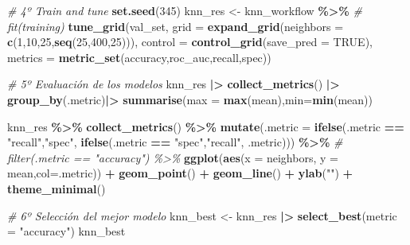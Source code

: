 \documentclass[12pt,a4paper,]{book}
\newenvironment{Shaded}{\begin{snugshade}}{\end{snugshade}}
\newcommand{\AttributeTok}[1]{\textcolor[rgb]{0.13,0.29,0.53}{#1}}
\newcommand{\CommentTok}[1]{\textcolor[rgb]{0.56,0.35,0.01}{\textit{#1}}}
\newcommand{\ConstantTok}[1]{\textcolor[rgb]{0.56,0.35,0.01}{#1}}
\newcommand{\DecValTok}[1]{\textcolor[rgb]{0.00,0.00,0.81}{#1}}
\newcommand{\FunctionTok}[1]{\textcolor[rgb]{0.13,0.29,0.53}{\textbf{#1}}}
\newcommand{\NormalTok}[1]{#1}
\newcommand{\OtherTok}[1]{\textcolor[rgb]{0.56,0.35,0.01}{#1}}
\newcommand{\SpecialCharTok}[1]{\textcolor[rgb]{0.81,0.36,0.00}{\textbf{#1}}}
\newcommand{\StringTok}[1]{\textcolor[rgb]{0.31,0.60,0.02}{#1}}
\numberwithin{dummy}{section}
\theoremstyle{ocrenumbox}
\theoremstyle{blacknumex}
\theoremstyle{blacknumbox}
\theoremstyle{ocrenum}
\theoremstyle{ocrenum}
\begin{document}
\begin{Shaded}
\begin{Highlighting}[]
\CommentTok{\# 4º Train and tune}
\FunctionTok{set.seed}\NormalTok{(}\DecValTok{345}\NormalTok{)}
\NormalTok{knn\_res }\OtherTok{\textless{}{-}} 
\NormalTok{  knn\_workflow }\SpecialCharTok{\%\textgreater{}\%} 
  \CommentTok{\# fit(training)}
  \FunctionTok{tune\_grid}\NormalTok{(val\_set,}
            \AttributeTok{grid =} \FunctionTok{expand\_grid}\NormalTok{(}\AttributeTok{neighbors =} \FunctionTok{c}\NormalTok{(}\DecValTok{1}\NormalTok{,}\DecValTok{10}\NormalTok{,}\DecValTok{25}\NormalTok{,}\FunctionTok{seq}\NormalTok{(}\DecValTok{25}\NormalTok{,}\DecValTok{400}\NormalTok{,}\DecValTok{25}\NormalTok{))),}
            \AttributeTok{control =} \FunctionTok{control\_grid}\NormalTok{(}\AttributeTok{save\_pred =} \ConstantTok{TRUE}\NormalTok{),}
            \AttributeTok{metrics =} \FunctionTok{metric\_set}\NormalTok{(accuracy,roc\_auc,recall,spec))}

\CommentTok{\# 5º Evaluación de los modelos}
\NormalTok{knn\_res }\SpecialCharTok{|\textgreater{}} 
  \FunctionTok{collect\_metrics}\NormalTok{() }\SpecialCharTok{|\textgreater{}} 
  \FunctionTok{group\_by}\NormalTok{(.metric)}\SpecialCharTok{|\textgreater{}} 
  \FunctionTok{summarise}\NormalTok{(}\AttributeTok{max =} \FunctionTok{max}\NormalTok{(mean),}\AttributeTok{min=}\FunctionTok{min}\NormalTok{(mean))}

\NormalTok{knn\_res }\SpecialCharTok{\%\textgreater{}\%} 
  \FunctionTok{collect\_metrics}\NormalTok{() }\SpecialCharTok{\%\textgreater{}\%}  
  \FunctionTok{mutate}\NormalTok{(}\AttributeTok{.metric =} \FunctionTok{ifelse}\NormalTok{(.metric }\SpecialCharTok{==} \StringTok{"recall"}\NormalTok{,}\StringTok{"spec"}\NormalTok{,}
                          \FunctionTok{ifelse}\NormalTok{(.metric }\SpecialCharTok{==} \StringTok{"spec"}\NormalTok{,}\StringTok{"recall"}\NormalTok{,}
\NormalTok{                                 .metric))) }\SpecialCharTok{\%\textgreater{}\%} 
  \CommentTok{\# filter(.metric == "accuracy") \%\textgreater{}\%}
  \FunctionTok{ggplot}\NormalTok{(}\FunctionTok{aes}\NormalTok{(}\AttributeTok{x =}\NormalTok{ neighbors, }\AttributeTok{y =}\NormalTok{ mean,}\AttributeTok{col=}\NormalTok{.metric)) }\SpecialCharTok{+} 
  \FunctionTok{geom\_point}\NormalTok{() }\SpecialCharTok{+} 
  \FunctionTok{geom\_line}\NormalTok{() }\SpecialCharTok{+} 
  \FunctionTok{ylab}\NormalTok{(}\StringTok{""}\NormalTok{) }\SpecialCharTok{+}
  \FunctionTok{theme\_minimal}\NormalTok{()}

\CommentTok{\# 6º Selección del mejor modelo}
\NormalTok{knn\_best }\OtherTok{\textless{}{-}}\NormalTok{ knn\_res }\SpecialCharTok{|\textgreater{}} 
  \FunctionTok{select\_best}\NormalTok{(}\AttributeTok{metric =} \StringTok{"accuracy"}\NormalTok{)}
\NormalTok{knn\_best}
\end{Highlighting}
\end{Shaded}
\end{document}
